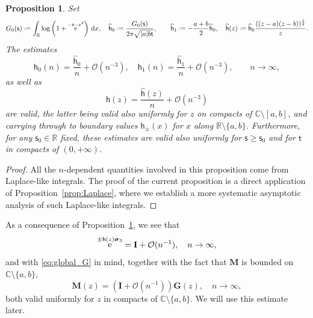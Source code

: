 \documentclass[reqno,a4paper,11pt]{amsart}
\DeclareMathOperator{\ee}{\rm e}
\newcommand{\C}{\mathbb{C}}
\newcommand{\R}{\mathbb{R}}
\newcommand{\Boh}{\mathcal{O}}
\newcommand{\dd}{\mathrm{d}}
\newcommand*{\deff}{\mathrel{\vcenter{\baselineskip0.5ex \lineskiplimit0pt
                     \hbox{\scriptsize.}\hbox{\scriptsize.}}}%
                     =}
\renewcommand{\bm}{\mathbf}
\newcommand{\msf}{\mathsf}
\newcommand{\wh}{\widehat}
\renewcommand{\sp}{\boldsymbol \sigma}
\newcommand{\sad}{\msf s}
\newtheorem{prop}[theorem]{Proposition}
\theoremstyle{definition}
\theoremstyle{remark}
\numberwithin{equation}{section}
\newcommand*{\defeq}{\mathrel{\vcenter{\baselineskip0.5ex \lineskiplimit0pt
                     \hbox{\scriptsize.}\hbox{\scriptsize.}}}%
                     =}
\begin{document}
\begin{prop}\label{prop:h_n_asymptotics}
    Set 
    \[
    G_0(\sad) \defeq \int_\R \log \left(
    1 + \ee^{-\sad -  x^2} \right) \, \dd x,\quad 
    \widehat{\msf h}_0 \defeq  
        \frac{ G_0(\sad)}{2 \pi \sqrt{|a|b \msf t }}, \quad
        \quad \wh{\msf h}_1\deff -\frac{a+b}{2}\wh{\msf h}_0,\quad
    \widehat {\msf h} (z) \defeq  
        \widehat{\msf h}_0 \frac{((z-a)(z-b))^{\frac{1}{2}}}{z}.
    \]
The estimates
%
    \begin{equation}\label{eq:estimates_h0_h1}
        \msf h_0(n) 
            = \frac{\widehat{\msf h}_0}{n} + \Boh \left( n^{-3}\right), \quad 
        \msf h_1(n) 
            = \frac{\widehat{\msf h}_1}{n} + \Boh(n^{-3}),\qquad n\to \infty,
    \end{equation}
    as well as
    \begin{equation}\label{eq:estimate_h}
        \msf h(z) =  \frac{ \widehat{\msf h}(z)}{n} + \Boh\left( n^{-3} \right)
    \end{equation}
    are valid, the latter being valid also uniformly for $z$ on compacts of $\C \setminus [a,b]$, and carrying through to boundary values $\msf h_{\pm}(x)$ for $x$ along $\R \setminus \{a,b\}$. Furthermore, for any $\sad_0\in \R$ fixed, these estimates are valid also uniformly for $\sad\geq \sad_0$ and for $\msf t$ in compacts of $(0,+\infty)$.
\end{prop}

\begin{proof}
All the $n$-dependent quantities involved in this proposition come from Laplace-like integrals. The proof of the current proposition is a direct application of Proposition~\ref{prop:Laplace}, where we establish a more systematic asymptotic analysis of such Laplace-like integrals.
\end{proof}

As a consequence of Proposition~\ref{prop:h_n_asymptotics}, we see that
%
\begin{equation}\label{eq:asymptotics_eh}
\ee^{\pm \msf h(z)\sp_3}=\bm I+\Boh(n^{-1}),\quad n\to \infty,
\end{equation}
%
and with \eqref{eq:global_G} in mind, together with the fact that $\bm M$ is bounded on $\C\setminus \{a,b\}$,
%
\begin{equation}\label{eq:gpMGasympt}
\bm M(z)=(\bm I+\Boh(n^{-1}))\bm G(z),\quad n\to \infty,
\end{equation}
%
both valid uniformly for $z$ in compacts of $\C\setminus \{a,b\}$. We will use this estimate later.
\end{document}
